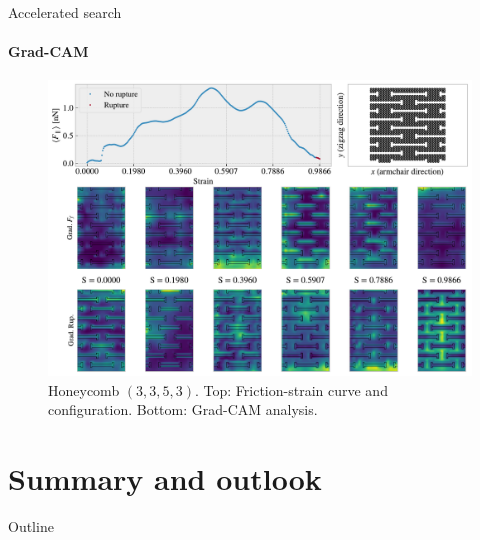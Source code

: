 \documentclass[
	10pt, %
]{beamer}
\begin{document}
%
%
\begin{frame}{Accelerated search}
	\framesubtitle{Grad-CAM}
	\begin{figure}[H]
		\centering
		\includegraphics[width=0.7\linewidth]{../thesis/figures/search/grad_cam_hon_3_3_5_3_12_0.pdf}
		\caption{Honeycomb $(3,3,5,3)$. Top: Friction-strain curve and configuration. Bottom: Grad-CAM analysis.}
	\end{figure}  
\end{frame}
%
%



\section{Summary and outlook} %
\begin{frame}{Outline}
    \tableofcontents[currentsection]
\end{frame}
\end{document}
